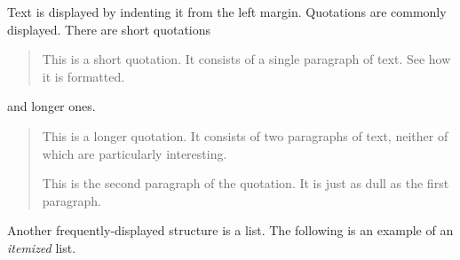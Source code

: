 Text is displayed by indenting it from the left
margin.  Quotations are commonly displayed.  There
are short quotations
\begin{quote}
   This is a short quotation.  It consists of a 
   single paragraph of text.  See how it is formatted.
\end{quote}
and longer ones.
\begin{quotation}
   This is a longer quotation.  It consists of two
   paragraphs of text, neither of which are
   particularly interesting.

   This is the second paragraph of the quotation.  It
   is just as dull as the first paragraph.
\end{quotation}
Another frequently-displayed structure is a list.
The following is an example of an \emph{itemized}
list.